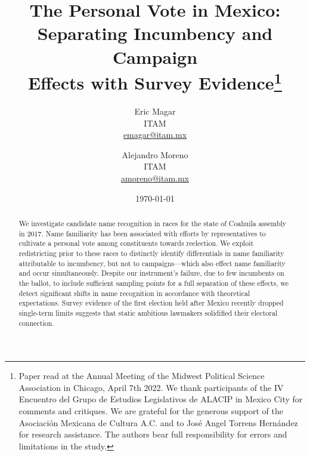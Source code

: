 \documentclass[letter,12pt]{article}
\begin{document}
\title{The Personal Vote in Mexico: \\ Separating Incumbency and Campaign \\Effects with Survey Evidence\thanks{Paper read at the Annual Meeting of the Midwest Political Science Association in Chicago, April 7th 2022. We thank participants of the IV Encuentro del Grupo de Estudios Legislativos de ALACIP in Mexico City for comments and critiques. We are grateful for the generous support of the Asociación Mexicana de Cultura A.C. and to José Angel Torrens Hernández for research assistance. The authors bear full responsibility for errors and limitations in the study.}}
\author{Eric Magar  \\ ITAM \\ \url{emagar@itam.mx} \and
        Alejandro Moreno \\ ITAM \\ \url{amoreno@itam.mx} 
}
\date{\today}
\maketitle


\begin{abstract}
\noindent We investigate candidate name recognition in races for the state of Coahuila assembly in 2017. Name familiarity has been associated with efforts by representatives to cultivate a personal vote among constituents towards reelection. We exploit redistricting prior to these races to distinctly identify differentials in name familiarity attributable to incumbency, but not to campaigns---which also effect name familiarity and occur simultaneously. Despite our instrument's failure, due to few incumbents on the ballot, to include sufficient sampling points for a full separation of these effects, we detect significant shifts in name recognition in accordance with theoretical expectations. Survey evidence of the first election held after Mexico recently dropped single-term limits suggests that static ambitious lawmakers solidified their electoral connection.
\end{abstract}
\end{document}
